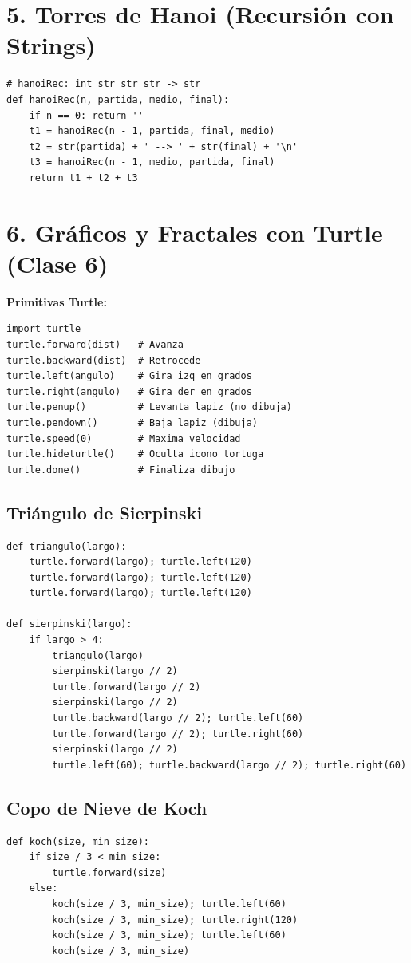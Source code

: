 \documentclass[8pt,twocolumn]{article}
\begin{document}
\section{5. Torres de Hanoi (Recursión con Strings)}
\begin{verbatim}
# hanoiRec: int str str str -> str
def hanoiRec(n, partida, medio, final):
    if n == 0: return ''
    t1 = hanoiRec(n - 1, partida, final, medio)
    t2 = str(partida) + ' --> ' + str(final) + '\n'
    t3 = hanoiRec(n - 1, medio, partida, final)
    return t1 + t2 + t3
\end{verbatim}

\section{6. Gráficos y Fractales con Turtle (Clase 6)}
\textbf{Primitivas Turtle:}
\begin{verbatim}
import turtle
turtle.forward(dist)   # Avanza
turtle.backward(dist)  # Retrocede
turtle.left(angulo)    # Gira izq en grados
turtle.right(angulo)   # Gira der en grados
turtle.penup()         # Levanta lapiz (no dibuja)
turtle.pendown()       # Baja lapiz (dibuja)
turtle.speed(0)        # Maxima velocidad
turtle.hideturtle()    # Oculta icono tortuga
turtle.done()          # Finaliza dibujo
\end{verbatim}

\subsection{Triángulo de Sierpinski}
\begin{verbatim}
def triangulo(largo):
    turtle.forward(largo); turtle.left(120)
    turtle.forward(largo); turtle.left(120)
    turtle.forward(largo); turtle.left(120)

def sierpinski(largo):
    if largo > 4:
        triangulo(largo)
        sierpinski(largo // 2)
        turtle.forward(largo // 2)
        sierpinski(largo // 2)
        turtle.backward(largo // 2); turtle.left(60)
        turtle.forward(largo // 2); turtle.right(60)
        sierpinski(largo // 2)
        turtle.left(60); turtle.backward(largo // 2); turtle.right(60)
\end{verbatim}

\subsection{Copo de Nieve de Koch}
\begin{verbatim}
def koch(size, min_size):
    if size / 3 < min_size:
        turtle.forward(size)
    else:
        koch(size / 3, min_size); turtle.left(60)
        koch(size / 3, min_size); turtle.right(120)
        koch(size / 3, min_size); turtle.left(60)
        koch(size / 3, min_size)
\end{verbatim}
\end{document}
